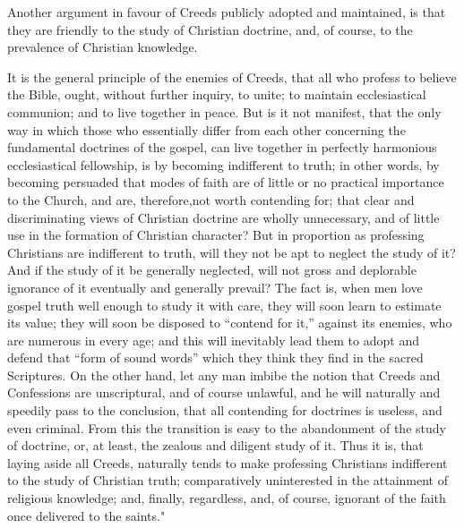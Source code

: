 \documentclass[
]{book}
\begin{document}
Another argument in favour of Creeds publicly adopted and maintained, is that they are friendly to the study of Christian doctrine, and, of course, to the prevalence of Christian knowledge.

It is the general principle of the enemies of Creeds, that all who profess to believe the Bible, ought, without further inquiry, to unite; to maintain ecclesiastical communion; and to live together in peace. But is it not manifest, that the only way in which those who essentially differ from each other concerning the fundamental doctrines of the gospel, can live together in perfectly harmonious ecclesiastical fellowship, is by becoming indifferent to truth; in other words, by becoming persuaded that modes of faith are of little or no practical importance to the Church, and are, therefore,not worth contending for; that clear and discriminating views of Christian doctrine are wholly unnecessary, and of little use in the formation of Christian character? But in proportion as professing Christians are indifferent to truth, will they not be apt to neglect the study of it? And if the study of it be generally neglected, will not gross and deplorable ignorance of it eventually and generally prevail? The fact is, when men love gospel truth well enough to study it with care, they will soon learn to estimate its value; they will soon be disposed to ``contend for it,'' against its enemies, who are numerous in every age; and this will inevitably lead them to adopt and defend that ``form of sound words'' which they think they find in the sacred Scriptures. On the other hand, let any man imbibe the notion that Creeds and Confessions are unscriptural, and of course unlawful, and he will naturally and speedily pass to the conclusion, that all contending for doctrines is useless, and even criminal. From this the transition is easy to the abandonment of the study of doctrine, or, at least, the zealous and diligent study of it. Thus it is, that laying aside all Creeds, naturally tends to make professing Christians indifferent to the study of Christian truth; comparatively uninterested in the attainment of religious knowledge; and, finally, regardless, and, of course, ignorant of the faith once delivered to the saints."
\end{document}
